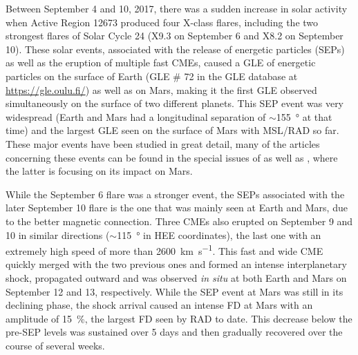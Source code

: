 Between September 4 and 10, 2017, there was a sudden increase in solar activity when Active Region 12673 produced four X-class flares, including the two strongest flares of Solar Cycle 24 (X9.3 on September 6 and X8.2 on September 10).
These solar events, associated with the release of energetic particles (\acp{SEP}) as well as the eruption of multiple fast \acp{CME}, caused a \ac{GLE} of energetic particles on the surface of Earth (\ac{GLE} \# 72 in the \ac{GLE} database at \url{https://gle.oulu.fi/}) as well as on Mars, making it the first \ac{GLE} observed simultaneously on the surface of two different planets.
This \ac{SEP} event was very widespread (Earth and Mars had a longitudinal separation of $\sim$\SI{155}{\degree} at that time) and the largest GLE seen on the surface of Mars with \ac{MSL}/\ac{RAD} so far.
These major events have been studied in great detail, many of the articles concerning these events can be found in the special issues of \citet{SpaceWeather-2018-special-issue-September-event} as well as \citet{GRL-2018-special-issue-September-event}, where the latter is focusing on its impact on Mars.

While the September 6 flare was a stronger event, the \acp{SEP} associated with the later September 10 flare is the one that was mainly seen at Earth and Mars, due to the better magnetic connection. Three CMEs also erupted on September 9 and 10 in similar directions ($\sim$\SI{115}{\degree} in \ac{HEE} coordinates), the last one with an extremely high speed of more than \SI{2600}{\kilo\meter\per\second}. This fast and wide CME quickly merged with the two previous ones and formed an intense interplanetary shock, propagated outward and was observed \textit{in situ} at both Earth and Mars on September 12 and 13, respectively. While the \ac{SEP} event at Mars was still in its declining phase, the shock arrival caused an intense \ac{FD} at Mars with an amplitude of \SI{15}{\percent}, the largest \ac{FD} seen by \ac{RAD} to date. This decrease below the pre-\ac{SEP} levels was sustained over 5 days and then gradually recovered over the course of several weeks.

